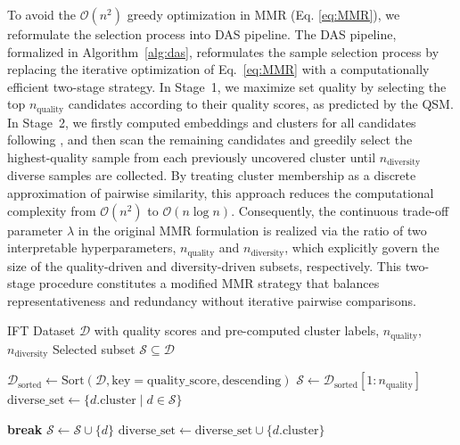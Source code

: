 \documentclass[sigconf]{acmart}
\begin{document}
To avoid the $\mathcal{O}(n^2)$ greedy optimization in MMR (Eq. \ref{eq:MMR}), we reformulate the selection process into DAS pipeline. The DAS pipeline, formalized in Algorithm~\ref{alg:das}, reformulates the sample selection process by replacing the iterative optimization of Eq.~\ref{eq:MMR} with a computationally efficient two-stage strategy. In Stage~1, we maximize set quality by selecting the top $n_{\text{quality}}$ candidates according to their quality scores, as predicted by the QSM. In Stage~2, we firstly computed embeddings and clusters for all candidates following \cite{ge2024car}, and then scan the remaining candidates and greedily select the highest-quality sample from each previously uncovered cluster until $n_{\text{diversity}}$ diverse samples are collected. By treating cluster membership as a discrete approximation of pairwise similarity, this approach reduces the computational complexity from $\mathcal{O}(n^2)$ to $\mathcal{O}(n \log n)$. Consequently, the continuous trade-off parameter $\lambda$ in the original MMR formulation is realized via the ratio of two interpretable hyperparameters, $n_{\text{quality}}$ and $n_{\text{diversity}}$, which explicitly govern the size of the quality-driven and diversity-driven subsets, respectively. This two-stage procedure constitutes a modified MMR strategy that balances representativeness and redundancy without iterative pairwise comparisons.


\begin{algorithm}[t]
\caption{Diversity-Aware Selection (DAS): Two-stage algorithm for constructing high-quality, semantically diverse multilingual IFT subsets. Stage~1 selects top-$n_{\text{quality}}$ samples by QSM score; Stage~2 greedily augments with diverse samples from previously unseen clusters until $n_{\text{diversity}}$ is reached.}\label{alg:das}

\begin{algorithmic}[1]
\Require IFT Dataset $\mathcal{D}$ with quality scores and pre-computed cluster labels, $n_{\text{quality}}$, $n_{\text{diversity}}$
\Ensure Selected subset $\mathcal{S} \subseteq \mathcal{D}$

\State $\mathcal{D}_{\text{sorted}} \gets \text{Sort}(\mathcal{D}, \text{key} = \text{quality\_score}, \text{descending})$
\State $\mathcal{S} \gets \mathcal{D}_{\text{sorted}}[1:n_{\text{quality}}]$ 
\State $\text{diverse\_set} \gets \{ d.\text{cluster} \mid d \in \mathcal{S} \}$ 

        \State \textbf{break} 
    \EndIf
        \State $\mathcal{S} \gets \mathcal{S} \cup \{d\}$ 
        \State $\text{diverse\_set} \gets \text{diverse\_set} \cup \{d.\text{cluster}\}$
    \EndIf
\EndFor
\end{algorithmic}

\end{algorithm}
\end{document}
